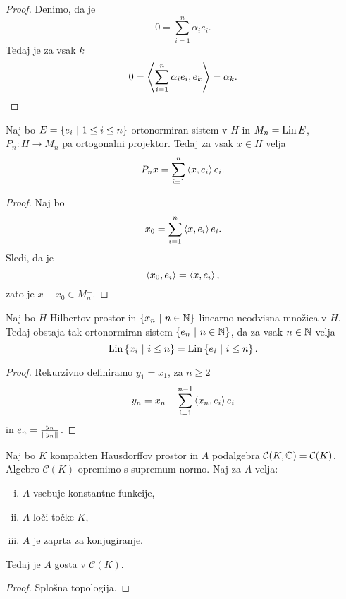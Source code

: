 \begin{proof}
Denimo, da je
\[
0 = \sum_{i=1}^n \alpha_i e_i.
\]
Tedaj je za vsak $k$
\[
0 = \left\langle \sum_{i=1}^n \alpha_i e_i, e_k\right\rangle = \alpha_k. \qedhere
\]
\end{proof}

\begin{trditev}
Naj bo $E = \left\{e_i~\middle\vert~1 \leq i \leq n\right\}$ ortonormiran sistem v $H$
in $M_n = \operatorname{Lin} E$, $P_n \colon H \to M_n$ pa ortogonalni projektor.
Tedaj za vsak $x \in H$ velja
\[
P_nx = \sum_{i=1}^n \left\langle x, e_i\right\rangle e_i.
\]
\end{trditev}

\begin{proof}
Naj bo
\[
x_0 = \sum_{i=1}^n \left\langle x, e_i\right\rangle e_i.
\]
Sledi, da je
\[
\left\langle x_0, e_i\right\rangle = \left\langle x, e_i\right\rangle,
\]
zato je $x - x_0 \in M_n^\bot$.
\end{proof}

\begin{izrek}
Naj bo $H$ Hilbertov prostor in $\left\{x_n~\middle\vert~n \in \mathbb{N}\right\}$ linearno
neodvisna množica v $H$. Tedaj obstaja tak ortonormiran sistem
$\left\{e_n~\middle\vert~n \in \mathbb{N}\right\}$, da za vsak $n \in \mathbb{N}$ velja
\[
\operatorname{Lin} \left\{x_i~\middle\vert~i \leq n\right\} = \operatorname{Lin} \left\{e_i~\middle\vert~i \leq n\right\}.
\]
\end{izrek}

\begin{proof}
Rekurzivno definiramo $y_1 = x_1$, za $n \geq 2$
\[
y_n = x_n - \sum_{i=1}^{n-1} \left\langle x_n, e_i\right\rangle e_i
\]
in $e_n = \frac{y_n}{\left\lVert y_n\right\rVert}$.
\end{proof}

\begin{izrek}
Naj bo $K$ kompakten Hausdorffov prostor in $A$ podalgebra
$\mathcal{C}(K, \mathbb{C}) = \mathcal{C}(K)$. Algebro $\mathcal{C}(K)$
opremimo s supremum normo. Naj za $A$ velja:

\begin{enumerate}[i)]
\item $A$ vsebuje konstantne funkcije,
\item $A$ loči točke $K$,
\item $A$ je zaprta za konjugiranje.
\end{enumerate}

Tedaj je $A$ gosta v $\mathcal{C}(K)$.
\end{izrek}

\begin{proof}
Splošna topologija.
\end{proof}

